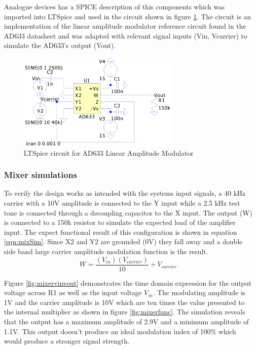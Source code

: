 Analogue devices has a SPICE description of this components which was imported into LTSpice and used in the circuit shown in figure \ref{fig:amCirc}. The circuit is an implementation of the linear amplitude modulator reference circuit found in the AD633 datasheet and was adapted with relevant signal inputs (Vin, Vcarrier) to simulate the AD633's output (Vout).

\begin{figure}[ht!]
    \centering
    \includegraphics[width=0.7\textwidth]{Figures/Design/Mixer/ad633mixer.png}
    \caption{LTSpice circuit for AD633 Linear Amplitude Modulator}
    \label{fig:amCirc}
\end{figure}

\subsubsection{Mixer simulations}
To verify the design works as intended with the systems input signals, a 40 kHz carrier with a 10V amplitude is connected to the Y input while a 2.5 kHz test tone is connected through a decoupling capacitor to the X input. The output (W) is connected to a 150k resistor to simulate the expected load of the amplifier input. The expect functional result of this configuration is shown in equation \ref{eqn:mixSim}. Since X2 and Y2 are grounded (0V) they fall away and a double side band large carrier amplitude modulation function is the result.
\begin{equation}\label{eqn:mixSim}
    W = \frac{(V_{in})(V_{carrier})}{10} + V_{carrier}
\end{equation}

Figure \ref{fig:mixervinvout} demonstrates the time domain expression for the output voltage across R1 as well as the input voltage $V_{in}$. The modulating amplitude is 1V and the carrier amplitude is 10V which are ten times the value presented to the internal multiplier as shown in figure \ref{fig:mixerfunc}. The simulation reveals that the output has a maximum amplitude of 2.9V and a minimum amplitude of 1.1V. This output doesn't produce an ideal modulation index of 100\% which would produce a stronger signal strength.

